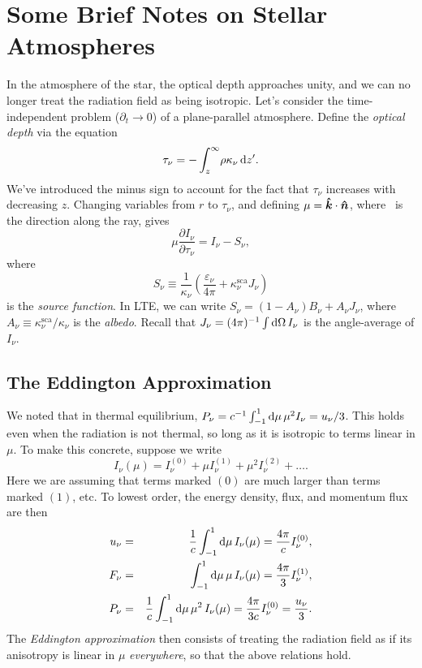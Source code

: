 \chapter[Stellar Atmospheres]{Some Brief Notes on Stellar Atmospheres}

In the atmosphere of the star, the optical depth approaches unity, and we can no longer treat the radiation field as being isotropic. Let's consider the time-independent problem ($\partial_{t}\to 0$) of a plane-parallel atmosphere. Define the \emph{optical depth} via the equation
\begin{equation}\label{e.optical-depth}
\tau_{\nu} = - \int _{z}^{\infty}\!\rho\kappa_{\nu}\,\mathrm{d} z'.
\end{equation}
We've introduced the minus sign to account for the fact that $\tau_{\nu}$ increases with decreasing $z$.
Changing variables from $r$ to $\tau_{\nu}$, and defining $\mu = \boldsymbol{\hat{k}}\cdot\boldsymbol{\hat{n}}$, where \unitn\ is the direction along the ray, gives
\begin{equation}\label{e.planar}
\mu\frac{\partial I_{\nu}}{\partial\tau_{\nu}} = I_{\nu}-S_{\nu},
\end{equation}
where 
\begin{equation}\label{e.source}
S_{\nu} \equiv \frac{1}{\kappa_{\nu}}\left(\frac{\varepsilon_{\nu}}{4\pi} + \kappa_{\nu}^{\mathrm{sca}}J_{\nu}\right)
\end{equation}
is the \emph{source function}. In LTE, we can write $S_{\nu} = (1-A_{\nu})B_{\nu} + A_{\nu}J_{\nu}$, where $A_{\nu} \equiv \kappa_{\nu}^{\mathrm{sca}}/\kappa_{\nu}$ is the \emph{albedo}.  Recall that $J_{\nu} = (4\pi)^{-1}\int\mathrm{d}\Omega\,I_{\nu}$ is the angle-average of $I_{\nu}$.

\section{The Eddington Approximation}

We noted that in thermal equilibrium, $P_{\nu} = c^{-1}\int_{-1}^{1}\mathrm{d}\mu\,\mu^{2}I_{\nu} = u_{\nu}/3$. This holds even when the radiation is not thermal, so long as it is isotropic to terms linear in $\mu$.  To make this concrete, suppose we write
\[ I_{\nu}(\mu) = I_{\nu}^{(0)} + \mu I_{\nu}^{(1)} + \mu^{2}I_{\nu}^{(2)} + \ldots. \]
Here we are assuming that terms marked $(0)$ are much larger than terms marked $(1)$, etc.  To lowest order, the energy density, flux, and momentum flux are then
\begin{eqnarray*}
u_{\nu} &=& \frac{1}{c}\int_{-1}^{1}\mathrm{d}\mu\,I_{\nu}(\mu) = \frac{4\pi}{c} I_{\nu}^{(0)},\\
F_{\nu} &=& \int_{-1}^{1}\mathrm{d}\mu\,\mu\,I_{\nu}(\mu) = \frac{4\pi}{3} I_{\nu}^{(1)},\\
P_{\nu} &=& \frac{1}{c}\int_{-1}^{1}\mathrm{d}\mu\,\mu^{2}\,I_{\nu}(\mu) = \frac{4\pi}{3c}I_{\nu}^{(0)} = \frac{u_{\nu}}{3}.
\end{eqnarray*}
The \emph{Eddington approximation} then consists of treating the radiation field as if its anisotropy is linear in $\mu$ \emph{everywhere}, so that the above relations hold.


